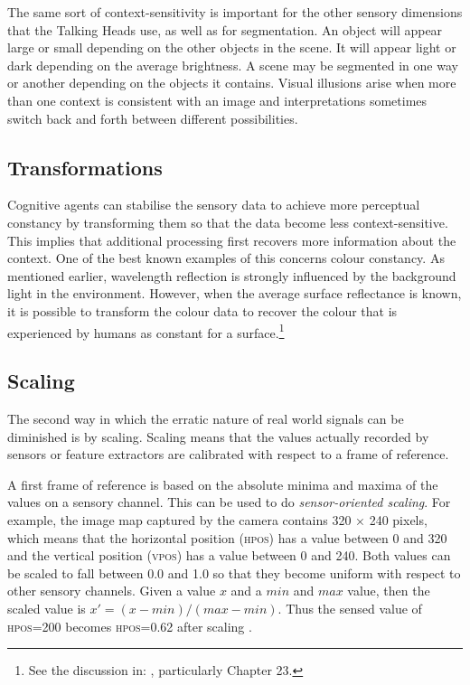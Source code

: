 The same sort of context-sensitivity 
is important for the other sensory dimensions 
that the Talking Heads use, as well as for segmentation. An 
object will appear large or small depending on the 
other objects in the scene. It will appear light 
or dark depending on the average brightness. 
A scene may be segmented in one way or another 
depending on the objects it contains. 
Visual illusions arise when more than one context
is consistent with an image and interpretations sometimes
switch back and forth between different possibilities. 

\subsection{Transformations}

Cognitive agents can stabilise the sensory data to
achieve more perceptual constancy by transforming them so 
that the data become less context-sensitive. 
This implies that additional processing first recovers
more information about the context. 
One of the best known examples of this concerns
colour constancy. As mentioned earlier, wavelength 
reflection is strongly influenced by the background 
light in the environment. However, when the average surface 
reflectance is known, it is possible to transform 
the colour data to recover the colour that is 
experienced by humans as constant for a surface.\footnote{
See the discussion in: \cite{Zeki:1993}, particularly Chapter 
23.}
 
\subsection{Scaling}

The second way in which the erratic nature of 
real world signals can be diminished is by
scaling. Scaling means that 
the values actually recorded by sensors or
feature extractors are calibrated with respect 
to a frame of reference. 

A first frame of reference is based on
the absolute minima and maxima of the values 
on a sensory channel. This can be used to do 
{\itshape sensor-oriented scaling}. For example, 
the image map captured by the camera
contains 320 × 240 pixels, which means 
that the horizontal position (\textsc{hpos}) has a value between
0 and 320 and the vertical position (\textsc{vpos}) has a value 
between 0 and 240. Both values can be scaled to fall between 
0.0 and 1.0 so that they become uniform with respect to 
other sensory channels. Given a value $x$ and a 
$min$ and $max$ value, then the scaled value is 
$x' = {(x - min)}/{(max - min)}$. 
Thus the sensed value of \textsc{hpos}=200 becomes
\textsc{hpos}=0.62 after scaling . 

